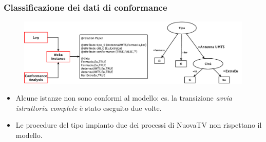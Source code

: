 
\begin{frame}
	\frametitle{Classificazione dei dati di conformance}
	\begin{figure}
	\includegraphics[scale=0.6]{./fig/decisiontree1}
	\end{figure}
	\begin{block}{}
	\begin{itemize}
	\item Alcune istanze non sono conformi al modello: es. la transizione \textit{avvia istruttoria complete} \`{e} stato eseguito due volte.
	\item Le procedure del tipo impianto due dei processi di NuovaTV non rispettano il modello.
	\end{itemize}
	\end{block}
	\end{frame}
	
	